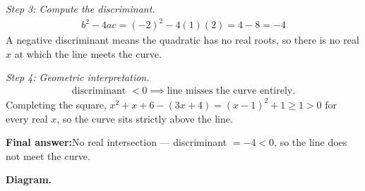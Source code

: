 \documentclass[11pt]{article}
\begin{document}
\textit{Step 3: Compute the discriminant.}
\[\begin{gathered}
b^2 - 4ac = (-2)^2 - 4(1)(2) = 4 - 8 = -4
\end{gathered}\]
A negative discriminant means the quadratic has no real roots, so there is no real \( x \) at which the line meets the curve.

\textit{Step 4: Geometric interpretation.}
\[\begin{gathered}
\text{discriminant } < 0 \implies \text{line misses the curve entirely.}
\end{gathered}\]
Completing the square, \( x^2 + x + 6 - (3x+4) = (x-1)^2 + 1 \geq 1 > 0 \) for every real \( x \), so the curve sits strictly above the line.

\begin{answerbox}
\textbf{Final answer:}\quad No real intersection --- discriminant \(\displaystyle = -4 < 0\), so the line does not meet the curve.
\end{answerbox}
\textbf{Diagram.}
\end{document}
